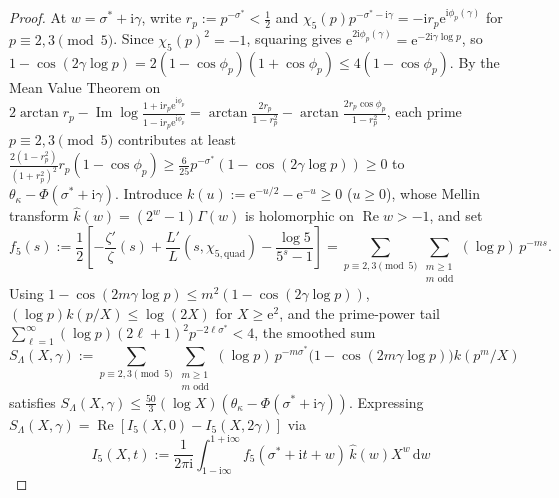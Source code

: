 \documentclass[11pt,a4paper,reqno]{amsart}
\theoremstyle{definition}
\theoremstyle{remark}
\numberwithin{equation}{section}
\newcommand{\dd}{\mathrm{d}}
\newcommand{\ii}{\mathrm{i}}
\newcommand{\ee}{\mathrm{e}}
\DeclareMathOperator{\Reop}{Re}
\DeclareMathOperator{\Imop}{Im}
\begin{document}
\begin{proof}
At $w = \sigma^* + \ii\gamma$, write $r_p := p^{-\sigma^*} < \frac{1}{2}$ and $\chi_5(p)p^{-\sigma^*-\ii\gamma} = -\ii r_p\ee^{\ii\phi_p(\gamma)}$ for $p \equiv 2,3 \pmod{5}$. Since $\chi_5(p)^2 = -1$, squaring gives $\ee^{2\ii\phi_p(\gamma)} = \ee^{-2\ii\gamma\log p}$, so $1 - \cos(2\gamma\log p) = 2(1 - \cos\phi_p)(1 + \cos\phi_p) \le 4(1 - \cos\phi_p)$. By the Mean Value Theorem on $2\arctan r_p - \Imop\log\frac{1 + \ii r_p\ee^{\ii\phi_p}}{1 - \ii r_p\ee^{\ii\phi_p}} = \arctan\frac{2r_p}{1 - r_p^2} - \arctan\frac{2r_p\cos\phi_p}{1 - r_p^2}$, each prime $p \equiv 2,3 \pmod{5}$ contributes at least $\frac{2(1 - r_p^2)}{(1 + r_p^2)^2}r_p(1 - \cos\phi_p) \ge \frac{6}{25}p^{-\sigma^*}(1 - \cos(2\gamma\log p)) \ge 0$ to $\theta_\kappa - \Phi(\sigma^* + \ii\gamma)$. Introduce $k(u) := \ee^{-u/2} - \ee^{-u} \ge 0$ ($u \ge 0$), whose Mellin transform $\widehat{k}(w) = (2^w - 1)\Gamma(w)$ is holomorphic on $\Reop w > -1$, and set
\begin{equation*}
  f_5(s) := \frac{1}{2}\left[-\frac{\zeta'}{\zeta}(s) + \frac{L'}{L}(s, \chi_{5,\mathrm{quad}}) - \frac{\log 5}{5^s - 1}\right]
  = \sum_{p \equiv 2,3 \pmod{5}}\sum_{\substack{m \ge 1 \\ m\text{ odd}}} (\log p)\,p^{-ms}.
\end{equation*}
Using $1 - \cos(2m\gamma\log p) \le m^2(1 - \cos(2\gamma\log p))$, $(\log p)k(p/X) \le \log(2X)$ for $X \ge \ee^2$, and the prime-power tail $\sum_{\ell=1}^\infty (\log p)(2\ell+1)^2 p^{-2\ell\sigma^*} < 4$, the smoothed sum
\begin{equation*}
  S_\Lambda(X,\gamma) := \sum_{p \equiv 2,3 \pmod{5}}\sum_{\substack{m \ge 1 \\ m\text{ odd}}} (\log p)\,p^{-m\sigma^*}\bigl(1 - \cos(2m\gamma\log p)\bigr)k(p^m/X)
\end{equation*}
satisfies $S_\Lambda(X,\gamma) \le \frac{50}{3}(\log X)(\theta_\kappa - \Phi(\sigma^* + \ii\gamma))$. Expressing $S_\Lambda(X,\gamma) = \Reop[I_5(X,0) - I_5(X,2\gamma)]$ via
\begin{equation*}
  I_5(X,t) := \frac{1}{2\pi\ii}\int_{1-\ii\infty}^{1+\ii\infty} f_5(\sigma^* + \ii t + w)\,\widehat{k}(w)X^w\,\dd w
\end{equation*}

\end{proof}
\end{document}
